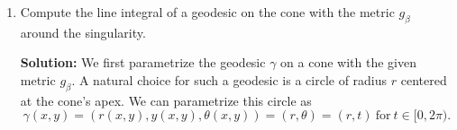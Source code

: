 \documentclass[notitlepage]{report}
\begin{document}
\begin{enumerate}
      \textbf{Solution:}

    \item Compute the line integral of a geodesic on the cone with the metric $g_\beta$ around the singularity.

      \textbf{Solution:} We first parametrize the geodesic $\gamma$ on a cone with the given metric $g_\beta$. A natural choice for such a geodesic is a circle of radius $r$ centered at the cone's apex. We can parametrize this circle as
      \[%
        \gamma(x, y) = (r(x,y), y(x, y), \theta(x, y)) = (r, \theta) = (r, t)~\text{for}~t \in [0, 2\pi)
      .\]%
  \end{enumerate}
\end{document}
